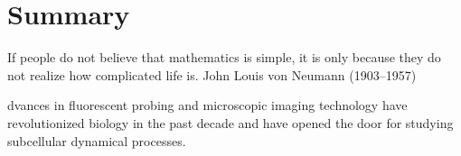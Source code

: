 %
%

\noquote
{}

\chpos{22mm}{12mm}
\chapter{Summary}


\mysquote{\textwidth}
{If people do not believe that mathematics is simple, it is only
  because they do not realize how complicated life is.}
{John Louis von Neumann (1903--1957)}



dvances in fluorescent probing and microscopic imaging
technology have revolutionized biology in the past decade and have
opened the door for studying subcellular dynamical processes. 




